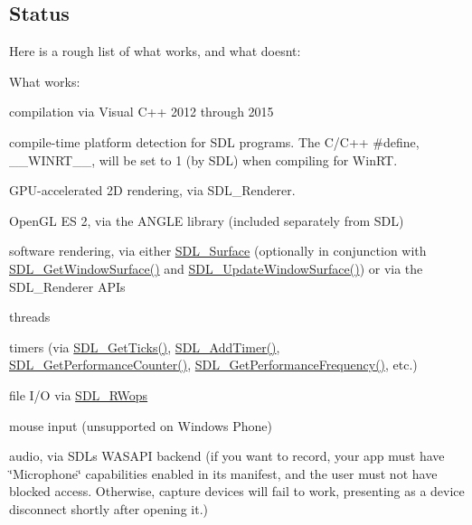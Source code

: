\subsection*{Status }

Here is a rough list of what works, and what doesn\textquotesingle{}t\+:


\begin{DoxyItemize}
\item What works\+:
\begin{DoxyItemize}
\item compilation via Visual C++ 2012 through 2015
\item compile-\/time platform detection for S\+DL programs. The C/\+C++ \#define, {\ttfamily \+\_\+\+\_\+\+W\+I\+N\+R\+T\+\_\+\+\_\+}, will be set to 1 (by S\+DL) when compiling for Win\+RT.
\item G\+P\+U-\/accelerated 2D rendering, via S\+D\+L\+\_\+\+Renderer.
\item Open\+GL ES 2, via the A\+N\+G\+LE library (included separately from S\+DL)
\item software rendering, via either \mbox{\hyperlink{struct_s_d_l___surface}{S\+D\+L\+\_\+\+Surface}} (optionally in conjunction with \mbox{\hyperlink{_s_d_l__video_8h_a0f7a1d102e1d5dd2d739ad70fe268385}{S\+D\+L\+\_\+\+Get\+Window\+Surface()}} and \mbox{\hyperlink{_s_d_l__video_8h_a7bbfee05788dc85a1d67218cf3006653}{S\+D\+L\+\_\+\+Update\+Window\+Surface()}}) or via the S\+D\+L\+\_\+\+Renderer A\+P\+Is
\item threads
\item timers (via \mbox{\hyperlink{_s_d_l__timer_8h_a0b9bc71d6287e0ffafdc3419760fe2b3}{S\+D\+L\+\_\+\+Get\+Ticks()}}, \mbox{\hyperlink{_s_d_l__timer_8h_a56ceea49587e3fa5796b2e4bf85603b8}{S\+D\+L\+\_\+\+Add\+Timer()}}, \mbox{\hyperlink{_s_d_l__timer_8h_a2dbeb63c4f0564811a4adf3938808977}{S\+D\+L\+\_\+\+Get\+Performance\+Counter()}}, \mbox{\hyperlink{_s_d_l__timer_8h_a507ebea12e31dacc9f85f7d9febe0efb}{S\+D\+L\+\_\+\+Get\+Performance\+Frequency()}}, etc.)
\item file I/O via \mbox{\hyperlink{struct_s_d_l___r_wops}{S\+D\+L\+\_\+\+R\+Wops}}
\item mouse input (unsupported on Windows Phone)
\item audio, via S\+DL\textquotesingle{}s W\+A\+S\+A\+PI backend (if you want to record, your app must have \char`\"{}\+Microphone\char`\"{} capabilities enabled in its manifest, and the user must not have blocked access. Otherwise, capture devices will fail to work, presenting as a device disconnect shortly after opening it.)

\end{DoxyItemize}
\end{DoxyItemize}
